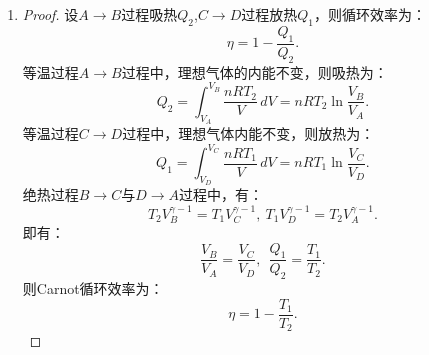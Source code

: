 \documentclass[reqno,a4paper,12pt]{amsart}
\begin{document}
\section{}
\begin{enumerate}
	\item
	\begin{proof}
		设$A \to B$过程吸热$Q_2$,$C \to D$过程放热$Q_1$，则循环效率为：
		\[
			\eta = 1 - \frac{Q_1}{Q_2}.
		\]
		等温过程$A \to B$过程中，理想气体的内能不变，则吸热为：
		\[
			Q_2 = \int_{V_A}^{V_B} \frac{nRT_2}{V} \,dV = nRT_2\ln\frac{V_B}{V_A}.
		\]
		等温过程$C \to D$过程中，理想气体内能不变，则放热为：
		\[
			Q_1 = \int_{V_D}^{V_C} \frac{nRT_1}{V} \,dV = nRT_1\ln\frac{V_C}{V_D}.
		\]
		绝热过程$B \to C$与$D \to A$过程中，有：
		\[
			T_2V_B^{\gamma-1} = T_1V_C^{\gamma-1},~T_1V_D^{\gamma-1} = T_2V_A^{\gamma-1}.
		\]
		即有：
		\[
			\frac{V_B}{V_A} = \frac{V_C}{V_D},~~\frac{Q_1}{Q_2} = \frac{T_1}{T_2}.
		\]
		则Carnot循环效率为：
		\[
			\eta = 1 - \frac{T_1}{T_2}.
		\]
	\end{proof}
\end{enumerate}
\end{document}
